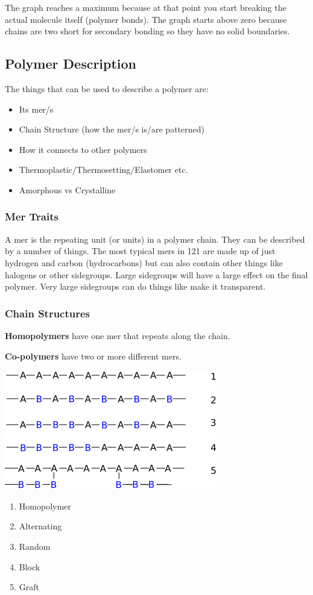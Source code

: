 \documentclass[12pt]{article}
\begin{document}
The graph reaches a maximum because at that point you start breaking the actual molecule itself (polymer bonds).
The graph starts above zero because chains are two short for secondary bonding so they have no solid boundaries.

\subsection{Polymer Description}
The things that can be used to describe a polymer are: 
\begin{itemize}
  \item Its mer/s
  \item Chain Structure (how the mer/s is/are patterned) 
  \item How it connects to other polymers
  \item Thermoplastic/Thermosetting/Elastomer etc.
  \item Amorphous vs Crystalline 
\end{itemize}

\subsubsection{Mer Traits}
A mer is the repeating unit (or units) in a polymer chain. 
They can be described by a number of things.
The most typical mers in 121 are made up of just hydrogen and carbon (hydrocarbons) but can also contain other things like halogens or other sidegroups.
Large sidegroups will have a large effect on the final polymer. 
Very large sidegroups can do things like make it transparent.

\subsubsection{Chain Structures}
\textbf{Homopolymers} have one mer that repeats along the chain.

\textbf{Co-polymers} have two or more different mers.


\begin{multicols}{2}
  \includegraphics[scale=0.5]{copolymers}
\begin{enumerate}
  \item Homopolymer
  \item Alternating 
  \item Random 
  \item Block 
  \item Graft
\end{enumerate}
\end{multicols}
\end{document}
